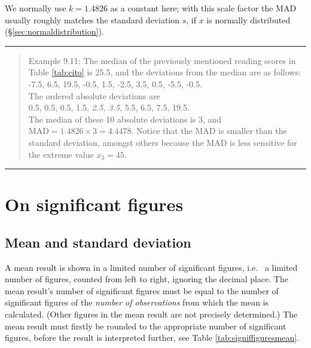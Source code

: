 \documentclass[
]{book}
\begin{document}
We normally use \(k=1.4826\) as a constant here; with this scale factor the MAD
usually roughly matches the standard deviation \(s\), if \(x\) is
normally distributed (§\ref{sec:normaldistribution}).

\begin{center}\rule{0.5\linewidth}{0.5pt}\end{center}

\begin{quote}
Example 9.11:
The median of the previously mentioned reading scores in
Table \ref{tab:cito} is
25.5, and the deviations from the median are as follows:\\
-7.5, 6.5, 19.5, -0.5, 1.5, -2.5, 3.5, 0.5, -5.5, -0.5.\\
The ordered absolute deviations are\\
0.5, 0.5, 0.5, 1.5, \emph{2.5, 3.5}, 5.5, 6.5, 7.5, 19.5.\\
The median of these 10 absolute deviations is 3, and
\(\textrm{MAD} = 1.4826 \times 3 = 4.4478\). Notice that the MAD
is smaller than the standard deviation, amongst others because the MAD is less sensitive
for the extreme value \(x_3=45\).
\end{quote}

\begin{center}\rule{0.5\linewidth}{0.5pt}\end{center}

\hypertarget{sec:significantfigures}{%
\section{On significant figures}\label{sec:significantfigures}}

\hypertarget{sec:significantfigures-means}{%
\subsection{Mean and standard deviation}\label{sec:significantfigures-means}}

A mean result is shown in a limited number of significant figures, i.e.~
a limited number of figures, counted from left to right, ignoring the decimal place.
The mean result's number of significant figures must be equal to the
number of significant figures of the \emph{number of observations} from which the
mean is calculated. (Other figures in the mean result are not precisely
determined.) The mean result must firstly be rounded to the
appropriate number of significant figures, before the result is interpreted
further, see
Table \ref{tab:signiffiguresmean}.
\end{document}
